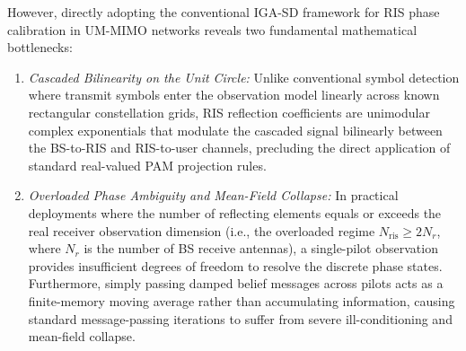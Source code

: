 \documentclass[conference]{IEEEtran}
\begin{document}
However, directly adopting the conventional IGA-SD framework \cite{b1} for RIS phase calibration in UM-MIMO networks reveals two fundamental mathematical bottlenecks:
\begin{enumerate}
	\item \textit{Cascaded Bilinearity on the Unit Circle:} Unlike conventional symbol detection \cite{b1} where transmit symbols enter the observation model linearly across known rectangular constellation grids, RIS reflection coefficients are unimodular complex exponentials that modulate the cascaded signal bilinearly between the BS-to-RIS and RIS-to-user channels, precluding the direct application of standard real-valued PAM projection rules.
	\item \textit{Overloaded Phase Ambiguity and Mean-Field Collapse:} In practical deployments where the number of reflecting elements equals or exceeds the real receiver observation dimension (i.e., the overloaded regime $N_{\mathrm{ris}} \ge 2N_r$, where $N_r$ is the number of BS receive antennas), a single-pilot observation provides insufficient degrees of freedom to resolve the discrete phase states. Furthermore, simply passing damped belief messages across pilots acts as a finite-memory moving average rather than accumulating information, causing standard message-passing iterations to suffer from severe ill-conditioning and mean-field collapse.
\end{enumerate}
\end{document}
